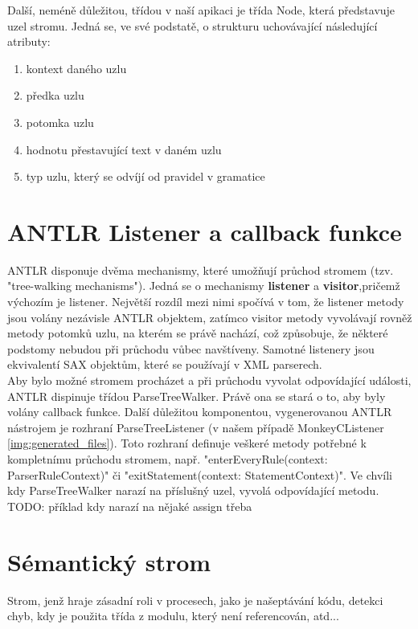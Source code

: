 Další, neméně důležitou, třídou v naší apikaci je třída Node, která představuje uzel stromu. Jedná se, ve své podstatě, o strukturu uchovávající následující atributy:\\
\begin{enumerate}
	\item kontext daného uzlu
	\item předka uzlu
	\item potomka uzlu
	\item hodnotu přestavující text v daném uzlu
	\item typ uzlu, který se odvíjí od pravidel v gramatice
\end{enumerate}




\section{ANTLR Listener a callback funkce}
ANTLR disponuje dvěma mechanismy, které umožňují průchod stromem (tzv. "tree-walking mechanisms"). Jedná se o mechanismy \textbf{listener} a \textbf{visitor},pričemž výchozím je listener. Největší rozdíl mezi nimi spočívá v tom, že listener metody jsou volány nezávisle ANTLR objektem, zatímco visitor metody vyvolávají rovněž metody potomků uzlu, na kterém se právě nachází, což způsobuje, že některé podstomy nebudou při průchodu vůbec navštíveny. Samotné listenery jsou ekvivalentí SAX objektům, které se používají v XML parserech.\\
Aby bylo možné stromem procházet a při průchodu vyvolat odpovídající události, ANTLR dispinuje třídou ParseTreeWalker. Právě ona se stará o to, aby byly volány callback funkce. Další důležitou komponentou, vygenerovanou ANTLR nástrojem je rozhraní ParseTreeListener (v našem případě MonkeyCListener \ref{img:generated_files}). Toto rozhraní definuje veškeré metody potřebné k kompletnímu průchodu stromem, např. "enterEveryRule(context: ParserRuleContext)" či "exitStatement(context: StatementContext)". Ve chvíli kdy ParseTreeWalker narazí na příslušný uzel, vyvolá odpovídající metodu. TODO: příklad kdy narazí na nějaké assign třeba


\section{Sémantický strom}
Strom, jenž hraje zásadní roli v procesech, jako je našeptávání kódu, detekci chyb, kdy je použita třída z modulu, který není referencován, atd...

